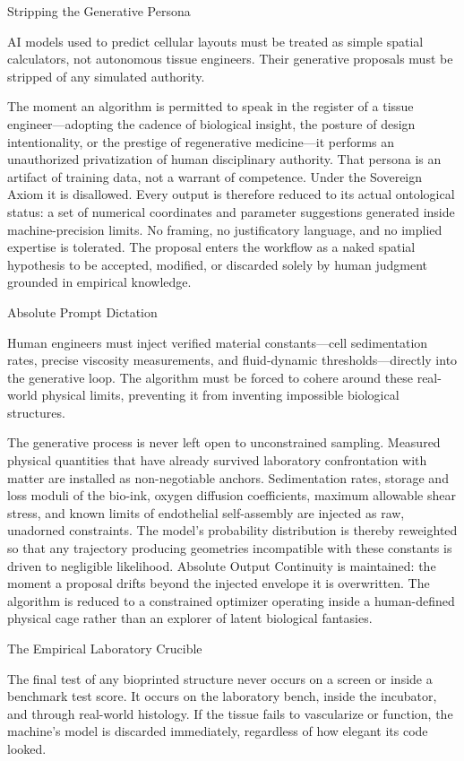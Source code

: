 Stripping the Generative Persona

AI models used to predict cellular layouts must be treated as simple spatial calculators, not autonomous tissue engineers. Their generative proposals must be stripped of any simulated authority.

The moment an algorithm is permitted to speak in the register of a tissue engineer—adopting the cadence of biological insight, the posture of design intentionality, or the prestige of regenerative medicine—it performs an unauthorized privatization of human disciplinary authority. That persona is an artifact of training data, not a warrant of competence. Under the Sovereign Axiom it is disallowed. Every output is therefore reduced to its actual ontological status: a set of numerical coordinates and parameter suggestions generated inside machine-precision limits. No framing, no justificatory language, and no implied expertise is tolerated. The proposal enters the workflow as a naked spatial hypothesis to be accepted, modified, or discarded solely by human judgment grounded in empirical knowledge.

Absolute Prompt Dictation

Human engineers must inject verified material constants—cell sedimentation rates, precise viscosity measurements, and fluid-dynamic thresholds—directly into the generative loop. The algorithm must be forced to cohere around these real-world physical limits, preventing it from inventing impossible biological structures.

The generative process is never left open to unconstrained sampling. Measured physical quantities that have already survived laboratory confrontation with matter are installed as non-negotiable anchors. Sedimentation rates, storage and loss moduli of the bio-ink, oxygen diffusion coefficients, maximum allowable shear stress, and known limits of endothelial self-assembly are injected as raw, unadorned constraints. The model’s probability distribution is thereby reweighted so that any trajectory producing geometries incompatible with these constants is driven to negligible likelihood. Absolute Output Continuity is maintained: the moment a proposal drifts beyond the injected envelope it is overwritten. The algorithm is reduced to a constrained optimizer operating inside a human-defined physical cage rather than an explorer of latent biological fantasies.

The Empirical Laboratory Crucible

The final test of any bioprinted structure never occurs on a screen or inside a benchmark test score. It occurs on the laboratory bench, inside the incubator, and through real-world histology. If the tissue fails to vascularize or function, the machine’s model is discarded immediately, regardless of how elegant its code looked.

